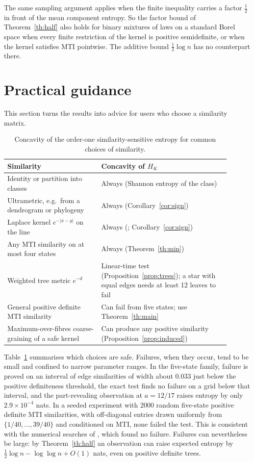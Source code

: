 \documentclass[11pt,a4paper]{article}
\theoremstyle{remark}
\begin{document}
The same sampling argument applies when the finite inequality carries a factor $\tfrac12$ in front of the mean component entropy. So the factor bound of Theorem~\ref{th:half} also holds for binary mixtures of laws on a standard Borel space when every finite restriction of the kernel is positive semidefinite, or when the kernel satisfies MTI pointwise. The additive bound $\tfrac12\log n$ has no counterpart there.

\section{Practical guidance}\label{sec:practice}
This section turns the results into advice for users who choose a similarity matrix.

\begin{table}[ht]
\centering\small
\begin{tabular}{p{0.38\linewidth}p{0.52\linewidth}}\toprule
Similarity & Concavity of $H_K$\\\midrule
Identity or partition into classes & Always (Shannon entropy of the class) \\
Ultrametric, e.g.\ from a dendrogram or phylogeny & Always (Corollary~\ref{cor:sign}) \\
Laplace kernel $e^{-|x-y|}$ on the line & Always (\cite[Theorem 4.4]{miller}; Corollary~\ref{cor:sign}) \\
Any MTI similarity on at most four states & Always (Theorem~\ref{th:min}) \\
Weighted tree metric $e^{-d}$ & Linear-time test (Proposition~\ref{prop:trees}); a star with equal edges needs at least 12 leaves to fail \\
General positive definite MTI similarity & Can fail from five states; use Theorem~\ref{th:main} \\
Maximum-over-fibres coarse-graining of a safe kernel & Can produce any positive similarity (Proposition~\ref{prop:induced}) \\\bottomrule
\end{tabular}
\caption{Concavity of the order-one similarity-sensitive entropy for common choices of similarity.}\label{tab:practice}
\end{table}

Table~\ref{tab:practice} summarises which choices are safe. Failures, when they occur, tend to be small and confined to narrow parameter ranges. In the five-state family, failure is proved on an interval of edge similarities of width about $0.033$ just below the positive definiteness threshold, the exact test finds no failure on a grid below that interval, and the part-revealing observation at $a=12/17$ raises entropy by only $2.9\times10^{-4}$ nats. In a seeded experiment with 2000 random five-state positive definite MTI similarities, with off-diagonal entries drawn uniformly from $\{1/40,\ldots,39/40\}$ and conditioned on MTI, none failed the test. This is consistent with the numerical searches of \cite[Supplement C.3]{gait}, which found no failure. Failures can nevertheless be large: by Theorem~\ref{th:half} an observation can raise expected entropy by $\tfrac12\log n-\log\log n+O(1)$ nats, even on positive definite trees.
\end{document}
